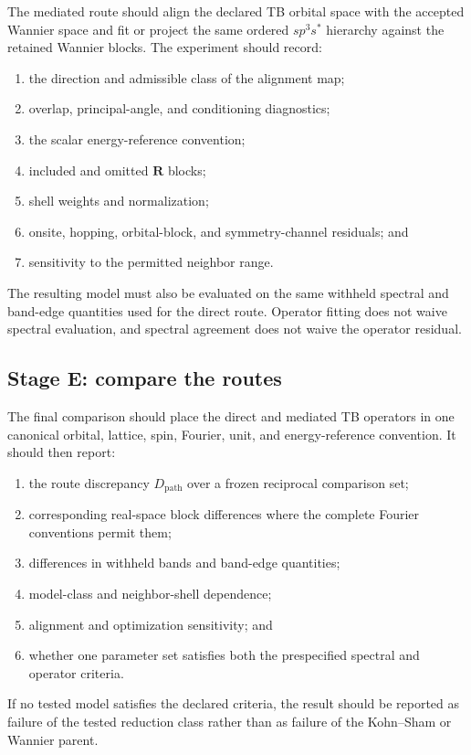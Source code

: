 The mediated route should align the declared TB orbital space with the accepted
Wannier space and fit or project the same ordered $sp^3s^{\ast}$ hierarchy
against the retained Wannier blocks. The experiment should record:
\begin{enumerate}
    \item the direction and admissible class of the alignment map;
    \item overlap, principal-angle, and conditioning diagnostics;
    \item the scalar energy-reference convention;
    \item included and omitted $\mathbf R$ blocks;
    \item shell weights and normalization;
    \item onsite, hopping, orbital-block, and symmetry-channel residuals; and
    \item sensitivity to the permitted neighbor range.
\end{enumerate}
The resulting model must also be evaluated on the same withheld spectral and
band-edge quantities used for the direct route. Operator fitting does not waive
spectral evaluation, and spectral agreement does not waive the operator
residual.

\subsection*{Stage E: compare the routes}

The final comparison should place the direct and mediated TB operators in one
canonical orbital, lattice, spin, Fourier, unit, and energy-reference
convention. It should then report:
\begin{enumerate}
    \item the route discrepancy $D_{\mathrm{path}}$ over a frozen reciprocal
          comparison set;
    \item corresponding real-space block differences where the complete
          Fourier conventions permit them;
    \item differences in withheld bands and band-edge quantities;
    \item model-class and neighbor-shell dependence;
    \item alignment and optimization sensitivity; and
    \item whether one parameter set satisfies both the prespecified spectral
          and operator criteria.
\end{enumerate}
If no tested model satisfies the declared criteria, the result should be
reported as failure of the tested reduction class rather than as failure of the
Kohn--Sham or Wannier parent.


